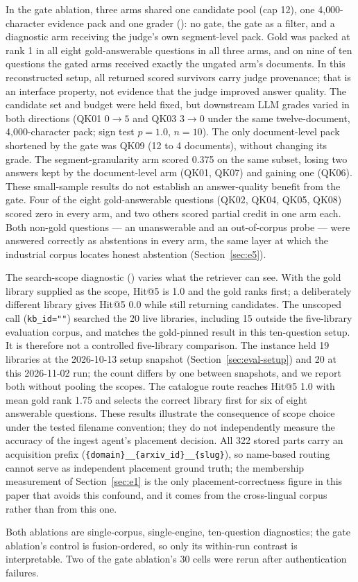 In the gate ablation, three arms shared one candidate pool (cap 12), one
4{,}000-character evidence pack and one grader
(): no gate,
the gate as a filter, and a diagnostic arm receiving the judge's own
segment-level pack. Gold was packed at rank 1 in all eight
gold-answerable questions in all three arms, and on nine of ten questions
the gated arms received exactly the ungated arm's documents.
In this reconstructed setup, all returned scored survivors carry judge
provenance; that is an interface property, not evidence that the judge improved
answer quality. The candidate set and budget were held fixed, but downstream
LLM grades varied in both directions (QK01
$0\to5$ and QK03 $3\to0$ under the same twelve-document, 4{,}000-character
pack; sign test $p=1.0$, $n=10$). The only document-level pack shortened by
the gate was QK09 (12 to 4 documents), without changing its grade. The
segment-granularity arm scored 0.375 on the same subset, losing two answers
kept by the document-level arm (QK01, QK07) and gaining one (QK06). These
small-sample results do not establish an answer-quality benefit from the gate. Four of the eight gold-answerable questions (QK02,
QK04, QK05, QK08) scored zero in every arm, and two others scored partial
credit in one arm each. Both
non-gold questions --- an unanswerable and an out-of-corpus probe --- were
answered correctly as abstentions in every arm, the same layer at which the
industrial corpus locates honest abstention (Section~\ref{sec:e5}).

The search-scope diagnostic
() varies
what the retriever can see. With the gold library supplied as the scope,
Hit@5 is 1.0 and the gold ranks first; a deliberately different library gives
Hit@5 0.0 while still returning candidates. The unscoped call
(\texttt{kb\_id=""}) searched the 20 live libraries, including 15 outside the
five-library evaluation corpus, and matches the gold-pinned result in this
ten-question setup. It is therefore not a controlled five-library comparison.
The instance held 19 libraries at the 2026-10-13 setup snapshot
(Section~\ref{sec:eval-setup}) and 20 at this 2026-11-02 run; the count differs
by one between snapshots, and we report both without pooling the scopes.
The catalogue route
reaches Hit@5 1.0 with mean gold rank 1.75 and selects the correct library
first for six of eight answerable questions. These results illustrate the
consequence of scope choice under the tested filename convention; they do not
independently measure the accuracy of the ingest agent's placement decision.
All 322 stored parts carry an acquisition prefix
(\texttt{\{domain\}\_\_\{arxiv\_id\}\_\_\{slug\}}), so name-based routing
cannot serve as independent placement ground truth; the membership
measurement of Section~\ref{sec:e1} is the only placement-correctness figure
in this paper that avoids this confound, and it comes from the cross-lingual
corpus rather than from this one.

Both ablations are single-corpus, single-engine, ten-question diagnostics; the
gate ablation's control is fusion-ordered, so only its within-run contrast is
interpretable. Two of the gate ablation's 30 cells were rerun after
authentication failures.
